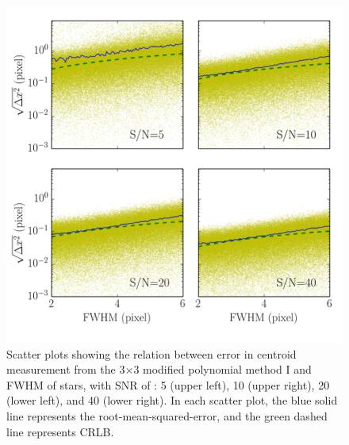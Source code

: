 \documentclass[12pt, preprint]{aastex}
\begin{document}
\begin{figure}[!htb]
  \includegraphics[width=\linewidth]{fwhm_psfpix28poly.png}
\endminipage
\caption{Scatter plots showing the relation between error in centroid measurement
from the 3$\times$3 modified polynomial method I and FWHM of stars, with SNR  of 
: 5 (upper left), 10 (upper right), 20 (lower left), and 40 (lower right). In each
scatter plot, the blue solid
 line represents the root-mean-squared-error, and the green dashed line represents CRLB.}\label{6}
\end{figure}
\end{document}
